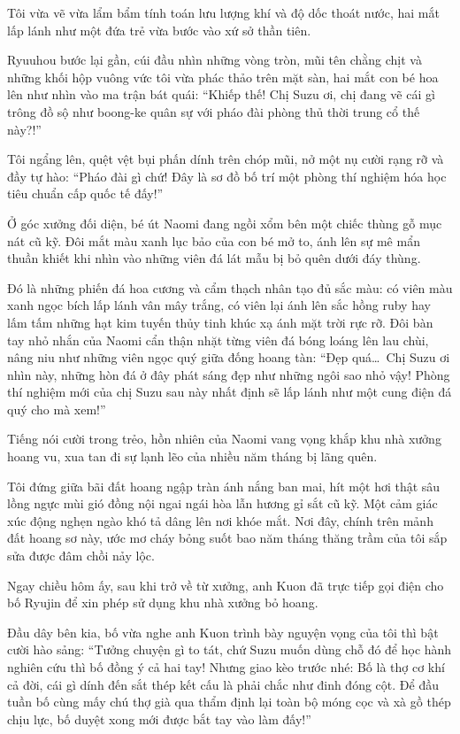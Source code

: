 \documentclass[../main.tex]{subfiles}
\begin{document}
Tôi vừa vẽ vừa lẩm bẩm tính toán lưu lượng khí và độ dốc thoát nước, hai mắt lấp lánh như một đứa trẻ vừa bước vào xứ sở thần tiên.

Ryuuhou bước lại gần, cúi đầu nhìn những vòng tròn, mũi tên chằng chịt và những khối hộp vuông vức tôi vừa phác thảo trên mặt sàn, hai mắt con bé hoa lên như nhìn vào ma trận bát quái: ``Khiếp thế! Chị Suzu ơi, chị đang vẽ cái gì trông đồ sộ như boong-ke quân sự với pháo đài phòng thủ thời trung cổ thế này?!''

Tôi ngẩng lên, quệt vệt bụi phấn dính trên chóp mũi, nở một nụ cười rạng rỡ và đầy tự hào: ``Pháo đài gì chứ! Đây là sơ đồ bố trí một phòng thí nghiệm hóa học tiêu chuẩn cấp quốc tế đấy!''

Ở góc xưởng đối diện, bé út Naomi đang ngồi xổm bên một chiếc thùng gỗ mục nát cũ kỹ. Đôi mắt màu xanh lục bảo của con bé mở to, ánh lên sự mê mẩn thuần khiết khi nhìn vào những viên đá lát mẫu bị bỏ quên dưới đáy thùng.

Đó là những phiến đá hoa cương và cẩm thạch nhân tạo đủ sắc màu: có viên màu xanh ngọc bích lấp lánh vân mây trắng, có viên lại ánh lên sắc hồng ruby hay lấm tấm những hạt kim tuyến thủy tinh khúc xạ ánh mặt trời rực rỡ. Đôi bàn tay nhỏ nhắn của Naomi cẩn thận nhặt từng viên đá bóng loáng lên lau chùi, nâng niu như những viên ngọc quý giữa đống hoang tàn: ``Đẹp quá\dots\ Chị Suzu ơi nhìn này, những hòn đá ở đây phát sáng đẹp như những ngôi sao nhỏ vậy! Phòng thí nghiệm mới của chị Suzu sau này nhất định sẽ lấp lánh như một cung điện đá quý cho mà xem!''

Tiếng nói cười trong trẻo, hồn nhiên của Naomi vang vọng khắp khu nhà xưởng hoang vu, xua tan đi sự lạnh lẽo của nhiều năm tháng bị lãng quên.

Tôi đứng giữa bãi đất hoang ngập tràn ánh nắng ban mai, hít một hơi thật sâu lồng ngực mùi gió đồng nội ngai ngái hòa lẫn hương gỉ sắt cũ kỹ. Một cảm giác xúc động nghẹn ngào khó tả dâng lên nơi khóe mắt. Nơi đây, chính trên mảnh đất hoang sơ này, ước mơ cháy bỏng suốt bao năm tháng thăng trầm của tôi sắp sửa được đâm chồi nảy lộc.

\ct

Ngay chiều hôm ấy, sau khi trở về từ xưởng, anh Kuon đã trực tiếp gọi điện cho bố Ryujin để xin phép sử dụng khu nhà xưởng bỏ hoang.

Đầu dây bên kia, bố vừa nghe anh Kuon trình bày nguyện vọng của tôi thì bật cười hào sảng: ``Tưởng chuyện gì to tát, chứ Suzu muốn dùng chỗ đó để học hành nghiên cứu thì bố đồng ý cả hai tay! Nhưng giao kèo trước nhé: Bố là thợ cơ khí cả đời, cái gì dính đến sắt thép kết cấu là phải chắc như đinh đóng cột. Để đầu tuần bố cùng mấy chú thợ già qua thẩm định lại toàn bộ móng cọc và xà gồ thép chịu lực, bố duyệt xong mới được bắt tay vào làm đấy!''
\end{document}
